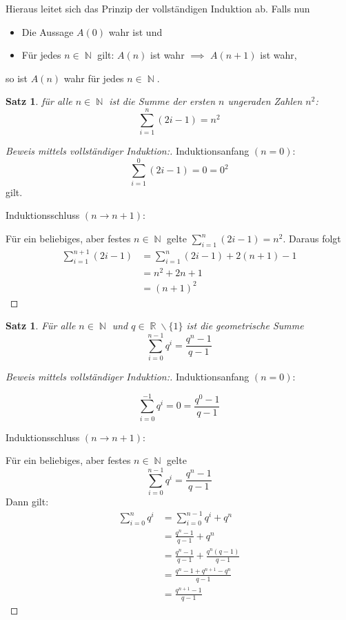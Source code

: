 \documentclass[a4paper,12pt]{article}
\DeclareMathOperator{\N}{\mathbb N}
\DeclareMathOperator{\R}{\mathbb R}
\newtheorem{satz}[axiom]{Satz}
\theoremstyle{definition}
\begin{document}
	Hieraus leitet sich das Prinzip der vollständigen Induktion ab. Falls nun
	\begin{itemize}
		\item Die Aussage $A(0)$ wahr ist und
		\item Für jedes $n \in \N$ gilt: $A(n)$ ist wahr $\implies$ $A(n+1)$ ist wahr, 
	\end{itemize}
	so ist $A(n)$ wahr für jedes $n \in \N$.
	\begin{satz}
		für alle $n \in \N$ ist die Summe der ersten $n$ ungeraden Zahlen $n^2$:
		\[
			\sum_{i = 1}^{n}(2i-1) = n^2
		\]
	\end{satz}
	\begin{proof}[Beweis mittels vollständiger Induktion:]
		
		Induktionsanfang $(n = 0)$:
		\[
			\sum_{i=1}^{0}(2i-1) = 0 = 0^2
		\] gilt.
		
		Induktionsschluss $(n\to n+1)$:
		
		Für ein beliebiges, aber festes $n \in \N$ gelte $\sum_{i=1}^{n}(2i-1) = n^2$. Daraus folgt
		\begin{align*}
			\sum_{i=1}^{n+1}(2i-1) &= \sum_{i=1}^{n}(2i-1) + 2(n+1)-1\\
			&= n^2+2n+1\\
			&= (n+1)^2
		\end{align*}
	\end{proof}
	\begin{satz}
		Für alle $n \in \N$ und $q \in \R \backslash \{1\}$ ist die geometrische Summe
		\[
			\sum_{i=0}^{n-1} q^i = \frac{q^n - 1}{q - 1}
		\]
	\end{satz}
	\begin{proof}[Beweis mittels vollständiger Induktion:]
		Induktionsanfang $(n = 0)$:
		
		\[
			\sum_{i = 0}^{-1} q^i = 0 = \frac{q^0-1}{q-1}
		\]
		
		Induktionsschluss $(n \to n+1)$:
		
		Für ein beliebiges, aber festes $n \in \N$ gelte
		\[
			\sum_{i = 0}^{n-1}q^i = \frac{q^n-1}{q-1}
		\]
		Dann gilt:
		\begin{align*}
			\sum_{i = 0}^{n}q^i &= \sum_{i = 0}^{n-1}q^i + q^n\\
			&= \frac{q^n - 1}{q-1} + q^n\\
			&= \frac{q^n - 1}{q-1} + \frac{q^n(q-1)}{q-1}\\
			&= \frac{q^n - 1 + q^{n+1} - q^n}{q-1}\\
			&= \frac{q^{n+1}-1}{q-1}
		\end{align*}
	\end{proof}
\end{document}
